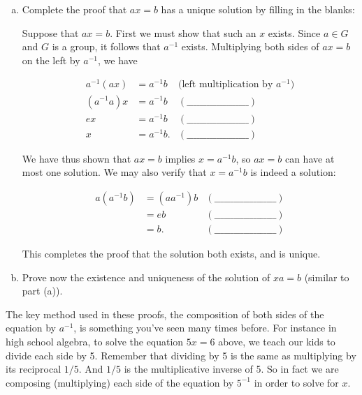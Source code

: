 \begin{exercise}{48}
\begin{enumerate}[(a)]
\item 
Complete the proof that $ax=b$ has a unique solution by filling in the blanks:

Suppose that $ax = b$. First we must show that such an $x$ exists. Since $a \in G$ and $G$ is a group, it follows that $a^{-1}$ exists.
Multiplying both sides of $ax = b$ on the left by $a^{-1}$, we have 

\begin{align*}
a^{-1}(ax) & = a^{-1}b &\mbox{(left multiplication by $a^{-1}$)}\\
(a^{-1}a)x & = a^{-1}b  &(\_\_\_\_\_\_\_\_\_\_\_\_\_\_\_\_\_\_\_) \\
ex & = a^{-1}b  &(\_\_\_\_\_\_\_\_\_\_\_\_\_\_\_\_\_\_\_) \\
x & = a^{-1}b.  &(\_\_\_\_\_\_\_\_\_\_\_\_\_\_\_\_\_\_\_)  
\end{align*} 
 
We have thus shown that $ax = b$ implies $x  = a^{-1}b$, so $ax = b$ can have at most one solution. We may also verify that $x  = a^{-1}b$ is indeed a solution:

\begin{align*}
a(a^{-1}b) & =  (aa^{-1})b  &(\_\_\_\_\_\_\_\_\_\_\_\_\_\_\_\_\_\_\_) \\
  & = eb  &(\_\_\_\_\_\_\_\_\_\_\_\_\_\_\_\_\_\_\_) \\
 & =b.  &(\_\_\_\_\_\_\_\_\_\_\_\_\_\_\_\_\_\_\_)  
\end{align*} 

This completes the proof that the solution both exists, and is unique.

\item
Prove now the existence and uniqueness of the solution of $xa = b$ (similar to part (a)).
\end{enumerate}
\end{exercise} 
 
The key method used in these proofs, the composition of both sides of the equation by $a^{-1}$, is something you've seen many times before.
For instance in high school algebra, to solve the equation $5x = 6$ above, we teach our kids to divide each side by 5.  Remember that dividing by 5 is the same as multiplying by its reciprocal $1/5$.  And $1/5$ is the multiplicative inverse of 5.  So in fact we are composing (multiplying) each side of the equation by $5^{-1}$ in order to solve for $x$.

